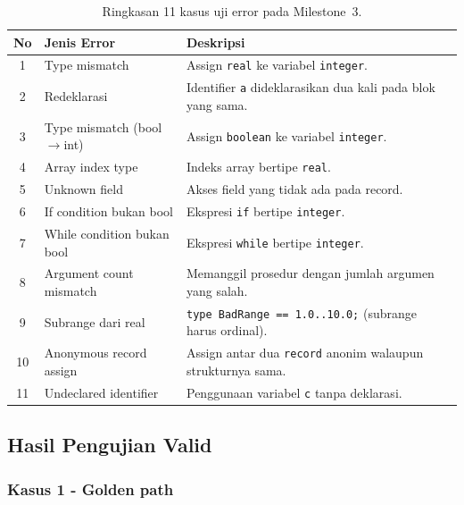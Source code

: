 \documentclass[11pt,a4paper]{article}
\begin{document}
\begin{table}[H]
\centering
\footnotesize
\begin{tabularx}{\textwidth}{c l X}
\toprule
\textbf{No} & \textbf{Jenis Error} & \textbf{Deskripsi} \\
\midrule
1  & Type mismatch                & Assign \texttt{real} ke variabel
                                    \texttt{integer}. \\
2  & Redeklarasi                  & Identifier \texttt{a} dideklarasikan
                                    dua kali pada blok yang sama. \\
3  & Type mismatch (bool$\to$int) & Assign \texttt{boolean} ke variabel
                                    \texttt{integer}. \\
4  & Array index type             & Indeks array bertipe \texttt{real}. \\
5  & Unknown field                & Akses field yang tidak ada pada record. \\
6  & If condition bukan bool      & Ekspresi \texttt{if} bertipe
                                    \texttt{integer}. \\
7  & While condition bukan bool   & Ekspresi \texttt{while} bertipe
                                    \texttt{integer}. \\
8  & Argument count mismatch      & Memanggil prosedur dengan jumlah argumen
                                    yang salah. \\
9  & Subrange dari real           & \texttt{type BadRange == 1.0..10.0;}
                                    (subrange harus ordinal). \\
10 & Anonymous record assign      & Assign antar dua \texttt{record} anonim
                                    walaupun strukturnya sama. \\
11 & Undeclared identifier        & Penggunaan variabel \texttt{c} tanpa
                                    deklarasi. \\
\bottomrule
\end{tabularx}
\caption{Ringkasan 11 kasus uji error pada Milestone~3.}
\label{tab:tests-err}
\end{table}

\subsection{Hasil Pengujian Valid}

\subsubsection*{Kasus 1 - Golden path}
\end{document}
